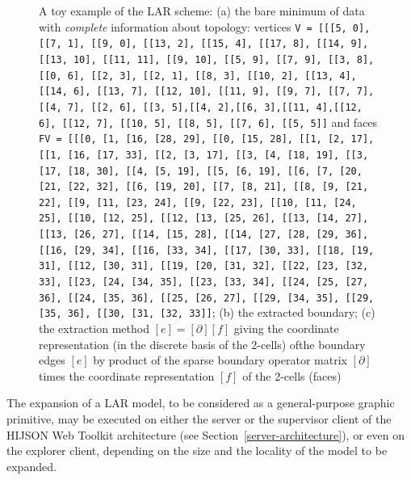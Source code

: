 \documentclass{sig-alternate}
\begin{document}
\begin{figure}[h!tb]
  \caption{A toy example of the LAR scheme: (a) the bare minimum of data with \emph{complete} information about topology: vertices {\scriptsize\texttt{V = [[[5, 0], [[7, 1], [[9, 0], [[13, 2], [[15, 4], [[17, 8], [[14, 9], [[13, 10], [[11, 11], [[9, 10], [[5, 9], [[7, 9], [[3, 8], [[0, 6], [[2, 3], [[2, 1], [[8, 3], [[10, 2], [[13, 4], [[14, 6], [[13, 7], [[12, 10], [[11, 9], [[9, 7], [[7, 7], [[4, 7], [[2, 6], [[3, 5],[[4, 2],[[6, 3],[[11, 4],[[12, 6], [[12, 7], [[10, 5], [[8, 5], [[7, 6], [[5, 5]]}} and faces {\scriptsize\texttt{FV = [[[0, [1, [16, [28, 29], [[0, [15, 28], [[1, [2, 17], [[1, [16, [17, 33], [[2, [3, 17], [[3, [4, [18, 19], [[3, [17, [18, 30], [[4, [5, 19], [[5, [6, 19], [[6, [7, [20, [21, [22, 32], [[6, [19, 20], [[7, [8, 21], [[8, [9, [21, 22], [[9, [11, [23, 24], [[9, [22, 23], [[10, [11, [24, 25], [[10, [12, 25], [[12, [13, [25, 26], [[13, [14, 27], [[13, [26, 27], [[14, [15, 28], [[14, [27, [28, [29, 36], [[16, [29, 34], [[16, [33, 34], [[17, [30, 33], [[18, [19, 31], [[12, [30, 31], [[19, [20, [31, 32], [[22, [23, [32, 33], [[23, [24, [34, 35], [[23, [33, 34], [[24, [25, [27, 36], [[24, [35, 36], [[25, [26, 27], [[29, [34, 35], [[29, [35, 36], [[30, [31, [32, 33]]}}; (b) the extracted boundary; (c) the extraction method $[e] = [\partial][f]$ giving the coordinate representation (in the discrete basis of the 2-cells) ofthe boundary edges $[e]$ by product of the sparse boundary operator matrix $[\partial]$ times the coordinate representation $[f]$ of the 2-cells (faces)}
  \label{fig:minimum}
\end{figure}

The expansion of a LAR model, to be considered as a general-purpose graphic
primitive, may be executed on either  the server or the supervisor client of
the HIJSON Web Toolkit architecture (see Section~\ref{server-architecture}),
or even on the explorer client, depending on the size and the locality of the
model to be expanded.
\end{document}

